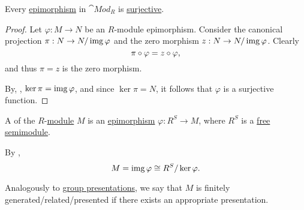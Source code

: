 \begin{proposition}\label{thm:module_epimorphisms_are_surjective}
  Every \hyperref[def:morphism_invertibility/right_cancellative]{epimorphism} in \hyperref[def:group/category]{\( \cat{Mod}_R \)} is \hyperref[def:function_invertibility/surjective]{surjective}.
\end{proposition}
\begin{proof}
  Let \( \varphi: M \to N \) be an \( R \)-module epimorphism. Consider the canonical projection \( \pi: N \to N / \operatorname{img} \varphi \) and the zero morphism \( z: N \to N / \operatorname{img} \varphi \). Clearly
  \begin{equation*}
    \pi \bincirc \varphi = z \bincirc \varphi,
  \end{equation*}
  and thus \( \pi = z \) is the zero morphism.

  By, , \( \ker \pi = \operatorname{img} \varphi \), and since \( \ker \pi = N \), it follows that \( \varphi \) is a surjective function.
\end{proof}

\begin{definition}\label{def:module_presentation}
  A  of the \( R \)-\hyperref[def:module]{module} \( M \) is an \hyperref[def:module/homomorphism]{epimorphism} \( \varphi: R^S \to M \), where \( R^S \) is a \hyperref[def:free_semimodule]{free semimodule}.

  By ,
  \begin{equation*}
    M = \operatorname{img} \varphi \cong R^S / \ker \varphi.
  \end{equation*}

  Analogously to \hyperref[def:group_presentation]{group presentations}, we say that \( M \) is finitely generated/related/presented if there exists an appropriate presentation.
\end{definition}
